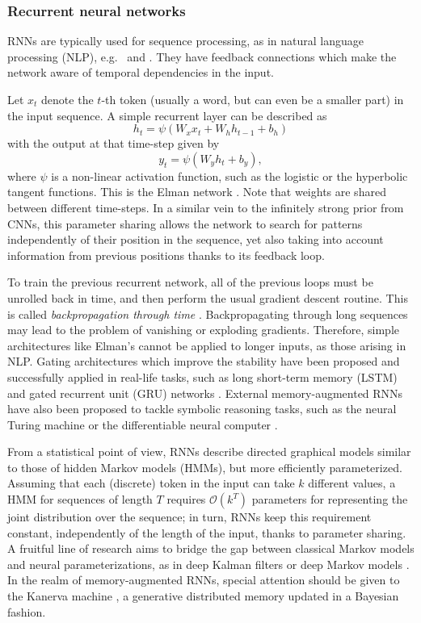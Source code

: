 \subsubsection{Recurrent neural networks} RNNs are typically used for sequence processing, as in natural language processing (NLP), e.g.\ \cite{hochreiter1997long} and \cite{chung2014empirical}. They have feedback connections which make the network aware of temporal dependencies in the input.

Let $x_t$ denote the $t$-th token (usually a word, but can even be 
a smaller part) in the input sequence. A simple recurrent layer can be described as
$$
h_t = \psi(W_x x_t + W_h h_{t-1} + b_h)
$$
with the output at that time-step given by
$$
y_t = \psi(W_y h_t + b_y),
$$
where $\psi$ is a non-linear activation function, such as the logistic or the hyperbolic tangent functions. This is the Elman network \citep{cruse2006neural}. Note that weights are shared between different time-steps. In a similar vein to the infinitely strong prior from CNNs, this parameter sharing allows the network to search for patterns independently of their position in the sequence, yet also taking into account information from previous positions thanks to its feedback loop.

To train the previous recurrent network, all of the previous loops must be unrolled back in time, and then perform the usual gradient descent routine.
This is called \emph{backpropagation through time} \citep{58337}.
Backpropagating through long sequences may lead to the problem of vanishing or exploding gradients. Therefore, 
simple architectures like Elman's cannot be applied to longer inputs, as those arising in NLP. Gating architectures which improve the stability have been proposed and successfully applied in real-life tasks,
such as long 
short-term memory (LSTM) \citep{hochreiter1997long} and gated recurrent unit (GRU) networks \citep{cho2014learning}. 
External memory-augmented RNNs have also been proposed to tackle symbolic reasoning tasks, such as the neural Turing machine \citep{graves2014neural} or the differentiable neural computer \citep{graves2016hybrid}.

From a statistical point of view, RNNs describe directed graphical models similar to those of hidden Markov models (HMMs), but more efficiently parameterized. Assuming that each (discrete) token in the input can take $k$ different values, a HMM for sequences of length $T$ requires $\mathcal{O}(k^T)$ parameters for representing the joint distribution over the sequence; in turn, RNNs keep this requirement constant, independently of the length of the input, thanks to parameter sharing. A fruitful line of research aims to bridge the gap between classical Markov models and neural parameterizations, as in deep Kalman filters \citep{krishnan2015deep} or deep Markov models \citep{krishnan2016structured}. In the realm of memory-augmented RNNs, special attention should be given to the Kanerva machine \citep{wu2018kanerva}, a generative distributed memory updated in a Bayesian fashion.



